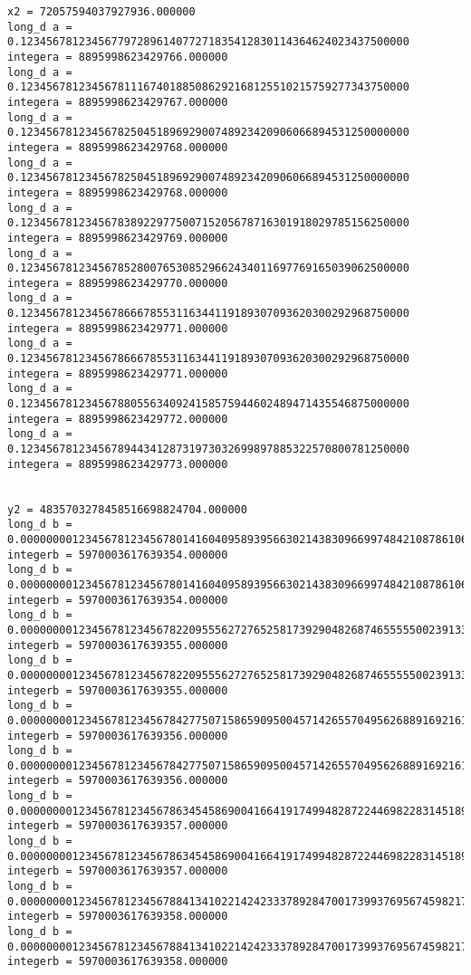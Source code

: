 \begin{lstlisting}
x2 = 72057594037927936.000000
long_d a = 0.123456781234567797289614077271835412830114364624023437500000
integera = 8895998623429766.000000
long_d a = 0.123456781234567811167401885086292168125510215759277343750000
integera = 8895998623429767.000000
long_d a = 0.123456781234567825045189692900748923420906066894531250000000
integera = 8895998623429768.000000
long_d a = 0.123456781234567825045189692900748923420906066894531250000000
integera = 8895998623429768.000000
long_d a = 0.123456781234567838922977500715205678716301918029785156250000
integera = 8895998623429769.000000
long_d a = 0.123456781234567852800765308529662434011697769165039062500000
integera = 8895998623429770.000000
long_d a = 0.123456781234567866678553116344119189307093620300292968750000
integera = 8895998623429771.000000
long_d a = 0.123456781234567866678553116344119189307093620300292968750000
integera = 8895998623429771.000000
long_d a = 0.123456781234567880556340924158575944602489471435546875000000
integera = 8895998623429772.000000
long_d a = 0.123456781234567894434128731973032699897885322570800781250000
integera = 8895998623429773.000000


y2 = 4835703278458516698824704.000000
long_d b = 0.000000001234567812345678014160409589395663021438309669974842108786106109619140625000000000
integerb = 5970003617639354.000000
long_d b = 0.000000001234567812345678014160409589395663021438309669974842108786106109619140625000000000
integerb = 5970003617639354.000000
long_d b = 0.000000001234567812345678220955562727652581739290482687465555500239133834838867187500000000
integerb = 5970003617639355.000000
long_d b = 0.000000001234567812345678220955562727652581739290482687465555500239133834838867187500000000
integerb = 5970003617639355.000000
long_d b = 0.000000001234567812345678427750715865909500457142655704956268891692161560058593750000000000
integerb = 5970003617639356.000000
long_d b = 0.000000001234567812345678427750715865909500457142655704956268891692161560058593750000000000
integerb = 5970003617639356.000000
long_d b = 0.000000001234567812345678634545869004166419174994828722446982283145189285278320312500000000
integerb = 5970003617639357.000000
long_d b = 0.000000001234567812345678634545869004166419174994828722446982283145189285278320312500000000
integerb = 5970003617639357.000000
long_d b = 0.000000001234567812345678841341022142423337892847001739937695674598217010498046875000000000
integerb = 5970003617639358.000000
long_d b = 0.000000001234567812345678841341022142423337892847001739937695674598217010498046875000000000
integerb = 5970003617639358.000000
\end{lstlisting}